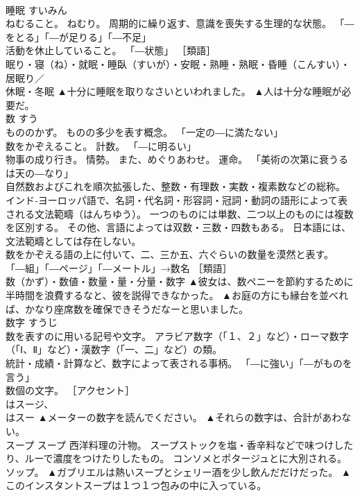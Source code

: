 \documentclass[8pt]{extreport}
\begin{document}
\begin{CJK}{UTF8}{min}
\\	睡眠	すいみん	
\\	ねむること。 ねむり。 周期的に繰り返す、意識を喪失する生理的な状態。 「―をとる」「―が足りる」「―不足」 
\\	活動を休止していること。 「―状態」 ［類語］
\\	眠り・寝（ね）・就眠・睡臥（すいが）・安眠・熟睡・熟眠・昏睡（こんすい）・居眠り／
\\	休眠・冬眠	▲十分に睡眠を取りなさいといわれました。 ▲人は十分な睡眠が必要だ。
\\	数	すう	
\\	もののかず。 ものの多少を表す概念。 「一定の―に満たない」 
\\	数をかぞえること。 計数。 「―に明るい」 
\\	物事の成り行き。 情勢。 また、めぐりあわせ。 運命。 「美術の次第に衰うるは天の―なり」 
\\	自然数およびこれを順次拡張した、整数・有理数・実数・複素数などの総称。 
\\	インド‐ヨーロッパ語で、名詞・代名詞・形容詞・冠詞・動詞の語形によって表される文法範疇（はんちゆう）。 一つのものには単数、二つ以上のものには複数を区別する。 その他、言語によっては双数・三数・四数もある。 日本語には、文法範疇としては存在しない。 
\\	数をかぞえる語の上に付いて、二、三か五、六ぐらいの数量を漠然と表す。 「―組」「―ページ」「―メートル」→数名 ［類語］
\\	数（かず）・数値・数量・量・分量・数字	▲彼女は、数ペニーを節約するために半時間を浪費するなと、彼を説得できなかった。 ▲お庭の方にも縁台を並べれば、かなり座席数を確保できそうだなーと思いました。
\\	数字	すうじ	
\\	数を表すのに用いる記号や文字。 アラビア数字（「１、２」など）・ローマ数字（「Ⅰ、Ⅱ」など）・漢数字（「一、二」など）の類。 
\\	統計・成績・計算など、数字によって表される事柄。 「―に強い」「―がものを言う」 
\\	数個の文字。 ［アクセント］ 
\\	はスージ、 
\\	はスー	▲メーターの数字を読んでください。 ▲それらの数字は、合計があわない。
\\	スープ	スープ	西洋料理の汁物。 スープストックを塩・香辛料などで味つけしたり、ルーで濃度をつけたりしたもの。 コンソメとポタージュとに大別される。 ソップ。	▲ガブリエルは熱いスープとシェリー酒を少し飲んだだけだった。 ▲このインスタントスープは１つ１つ包みの中に入っている。

\end{CJK}
\end{document}
